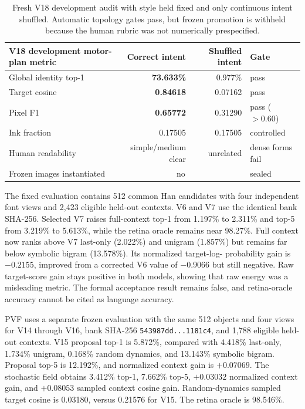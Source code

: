 \documentclass[11pt]{article}
\begin{document}
\begin{table}[t]
\centering
\small
\begin{tabular}{lrrl}
\toprule
V18 development motor-plan metric & Correct intent & Shuffled intent & Gate \\
\midrule
Global identity top-1 & \textbf{73.633\%} & 0.977\% & pass \\
Target cosine & \textbf{0.84618} & 0.07162 & pass \\
Pixel F1 & \textbf{0.65772} & 0.31290 & pass ($>0.60$) \\
Ink fraction & 0.17505 & 0.17505 & controlled \\
Human readability & simple/medium clear & unrelated & dense forms fail \\
Frozen images instantiated & \multicolumn{2}{c}{no} & sealed \\
\bottomrule
\end{tabular}
\caption{Fresh V18 development audit with style held fixed and only continuous
intent shuffled. Automatic topology gates pass, but frozen promotion is
withheld because the human rubric was not numerically prespecified.}
\label{tab:v18motor}
\end{table}

The fixed evaluation contains 512 common Han candidates with four independent
font views and 2,423 eligible held-out contexts. V6 and V7 use the identical
bank SHA-256. Selected V7 raises full-context top-1 from 1.197\% to 2.311\% and
top-5 from 3.219\% to 5.613\%, while the retina oracle remains near 98.27\%.
Full context now ranks above V7 last-only (2.022\%) and unigram (1.857\%) but
remains far below symbolic bigram (13.578\%). Its normalized target-log-
probability gain is $-0.2155$, improved from a corrected V6 value of $-0.9066$
but still negative. Raw target-score gain stays positive in both models, showing
that raw energy was a misleading metric. The formal acceptance result remains
false, and retina-oracle accuracy cannot be cited as language accuracy.

PVF uses a separate frozen evaluation with the same 512 objects and four views
for V14 through V16, bank SHA-256
\texttt{543987dd...1181c4},
and 1,788 eligible held-out contexts. V15 proposal top-1 is 5.872\%, compared
with 4.418\% last-only, 1.734\% unigram, 0.168\% random dynamics, and 13.143\%
symbolic bigram. Proposal top-5 is 12.192\%, and normalized context gain is
$+0.07069$. The stochastic field obtains 3.412\% top-1, 7.662\% top-5,
$+0.03032$ normalized context gain, and $+0.08053$ sampled context cosine gain.
Random-dynamics sampled target cosine is 0.03180, versus 0.21576 for V15. The
retina oracle is 98.546\%.
\end{document}
